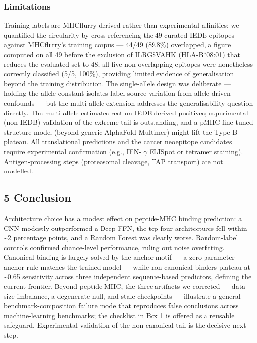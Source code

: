 \documentclass[10pt]{article}
\newcounter{none} %
\begin{document}
\subsubsection{Limitations}\label{limitations}

Training labels are MHCflurry-derived rather than experimental
affinities; we quantified the circularity by cross-referencing the 49
curated IEDB epitopes against MHCflurry's training corpus --- 44/49
(89.8\%) overlapped, a figure computed on all 49 before the exclusion of
ILRGSVAHK (HLA-B*08:01) that reduces the evaluated set to 48; all five
non-overlapping epitopes were nonetheless correctly classified (5/5,
100\%), providing limited evidence of generalisation beyond the training
distribution. The single-allele design was deliberate --- holding the
allele constant isolates label-source variation from allele-driven
confounds --- but the multi-allele extension addresses the
generalisability question directly. The multi-allele estimates rest on
IEDB-derived positives; experimental (non-IEDB) validation of the
extreme tail is outstanding, and a pMHC-fine-tuned structure model
(beyond generic AlphaFold-Multimer) might lift the Type B plateau. All
translational predictions and the cancer neoepitope candidates require
experimental confirmation (e.g., IFN- $\gamma$  ELISpot or tetramer staining).
Antigen-processing steps (proteasomal cleavage, TAP transport) are not
modelled.

\subsection{5 Conclusion}\label{conclusion}

Architecture choice has a modest effect on peptide-MHC binding
prediction: a CNN modestly outperformed a Deep FFN, the top four
architectures fell within \textasciitilde2 percentage points, and a
Random Forest was clearly worse. Random-label controls confirmed
chance-level performance, ruling out noise overfitting. Canonical
binding is largely solved by the anchor motif --- a zero-parameter
anchor rule matches the trained model --- while non-canonical binders
plateau at \textasciitilde0.65 sensitivity across three independent
sequence-based predictors, defining the current frontier. Beyond
peptide-MHC, the three artifacts we corrected --- data-size imbalance, a
degenerate null, and stale checkpoints --- illustrate a general
benchmark-composition failure mode that reproduces false conclusions
across machine-learning benchmarks; the checklist in Box 1 is offered as
a reusable safeguard. Experimental validation of the non-canonical tail
is the decisive next step.
\end{document}
